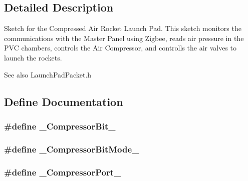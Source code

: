 \subsection{\-Detailed \-Description}
\-Sketch for the \-Compressed \-Air \-Rocket \-Launch \-Pad. \-This sketch monitors the communications with the \-Master \-Panel using \-Zigbee, reads air pressure in the \-P\-V\-C chambers, controls the \-Air \-Compressor, and controlls the air valves to launch the rockets. \begin{DoxySeeAlso}{\-See also}
\-Launch\-Pad\-Packet.\-h 
\end{DoxySeeAlso}


\subsection{\-Define \-Documentation}
\hypertarget{launchPad_8ino_abfe6a39ff27c8d82ff6490d3226dcb7c}{
\subsubsection[{\-\_\-\-Compressor\-Bit\-\_\-}]{\setlength{\rightskip}{0pt plus 5cm}\#define {\bf \-\_\-\-Compressor\-Bit\-\_\-}}}\label{launchPad_8ino_abfe6a39ff27c8d82ff6490d3226dcb7c}
\hypertarget{launchPad_8ino_a71f8d37be468b0d370427fea6df0c737}{
\subsubsection[{\-\_\-\-Compressor\-Bit\-Mode\-\_\-}]{\setlength{\rightskip}{0pt plus 5cm}\#define {\bf \-\_\-\-Compressor\-Bit\-Mode\-\_\-}}}\label{launchPad_8ino_a71f8d37be468b0d370427fea6df0c737}
\hypertarget{launchPad_8ino_a60fea168d2c06a57a10f542ba5329af5}{
\subsubsection[{\-\_\-\-Compressor\-Port\-\_\-}]{\setlength{\rightskip}{0pt plus 5cm}\#define {\bf \-\_\-\-Compressor\-Port\-\_\-}}}\label{launchPad_8ino_a60fea168d2c06a57a10f542ba5329af5}
